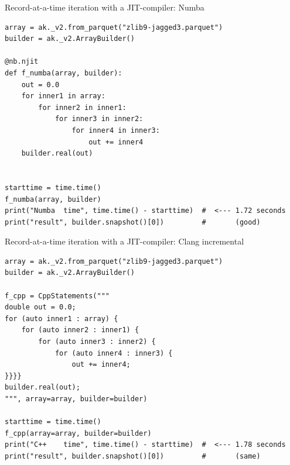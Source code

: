 \documentclass[aspectratio=169]{beamer}
\begin{document}
\begin{frame}[fragile]{Record-at-a-time iteration with a JIT-compiler: Numba}
\vspace{0.1 cm}
\small
\begin{verbatim}
array = ak._v2.from_parquet("zlib9-jagged3.parquet")
builder = ak._v2.ArrayBuilder()

@nb.njit
def f_numba(array, builder):
    out = 0.0
    for inner1 in array:
        for inner2 in inner1:
            for inner3 in inner2:
                for inner4 in inner3:
                    out += inner4
    builder.real(out)


starttime = time.time()
f_numba(array, builder)
print("Numba  time", time.time() - starttime)  #  <--- 1.72 seconds
print("result", builder.snapshot()[0])         #       (good)
\end{verbatim}
\end{frame}

\begin{frame}[fragile]{Record-at-a-time iteration with a JIT-compiler: Clang incremental}
\vspace{0.1 cm}
\small
\begin{verbatim}
array = ak._v2.from_parquet("zlib9-jagged3.parquet")
builder = ak._v2.ArrayBuilder()

f_cpp = CppStatements("""
double out = 0.0;
for (auto inner1 : array) {
    for (auto inner2 : inner1) {
        for (auto inner3 : inner2) {
            for (auto inner4 : inner3) {
                out += inner4;
}}}}
builder.real(out);
""", array=array, builder=builder)

starttime = time.time()
f_cpp(array=array, builder=builder)
print("C++    time", time.time() - starttime)  #  <--- 1.78 seconds
print("result", builder.snapshot()[0])         #       (same)
\end{verbatim}
\end{frame}
\end{document}
